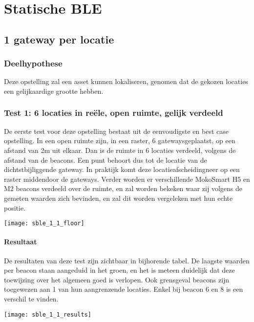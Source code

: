 \section{Statische BLE}
\subsection{1 gateway per locatie}
\subsubsection{Deelhypothese}
Deze opstelling zal een asset kunnen lokaliseren, genomen dat de gekozen locaties een gelijkaardige grootte hebben.

\subsubsection{Test 1: 6 locaties in reële, open ruimte, gelijk verdeeld}
\begin{minipage}{0.55\textwidth}
De eerste test voor deze opstelling bestaat uit de eenvoudigste en best case opstelling. In een open ruimte zijn, in een raster, 6 gateways\footnotemark geplaatst, op een afstand van 2m uit elkaar. Dan is de ruimte in 6 locaties verdeeld, volgens de afstand van de beacons. Een punt behoort dus tot de locatie van de dichtstbijliggende gateway. In praktijk komt deze locatieafscheiding\footnotemark neer op een raster middendoor de gateways. Verder worden er verschillende MokoSmart H5 en M2 beacons verdeeld over de ruimte, en zal worden bekeken waar zij volgens de gemeten waarden zich bevinden, en zal dit worden vergeleken met hun echte positie.
\end{minipage}
\hfill
\begin{minipage}{0.42\textwidth}
	\texttt{[image: sble\_1\_1\_floor]}
	\label{fig:ond-ble-static-1-1-ops}
\end{minipage}

\paragraph{Resultaat}
\begin{minipage}{0.55\textwidth}
De resultaten van deze test zijn zichtbaar in bijhorende tabel. De laagste waarden per beacon staan aangeduid in het groen, en het is meteen duidelijk dat deze toewijzing over het algemeen goed is verlopen. Ook grensgeval beacons zijn toegewezen aan 1 van hun aangrenzende locaties. Enkel bij beacon 6 en 8 is een verschil te vinden.
\end{minipage}
\hfill
\begin{minipage}{0.42\textwidth}
	\texttt{[image: sble\_1\_1\_results]}
	\label{fig:ond-ble-static-1-1-res}
\end{minipage}

